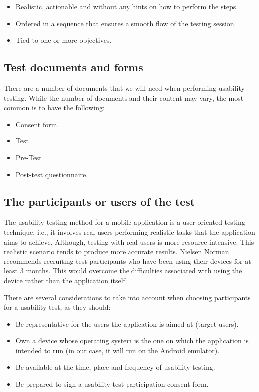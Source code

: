 \documentclass[./main.tex]{subfiles}
\begin{document}
\begin{itemize}
	\item Realistic, actionable and without any hints on how to perform the steps.
	\item Ordered in a sequence that ensures a smooth flow of the testing session.
	\item Tied to one or more objectives.
\end{itemize}

\subsection{Test documents and forms}
There are a number of documents that we will need when performing usability testing. While the number of documents and their content may vary, the most common is to have the following:

\begin{itemize}
	\item Consent form.
	\item Test 
	\item Pre-Test
	\item Post-test questionnaire.
\end{itemize}

\subsection{The participants or users of the test}

The usability testing method for a mobile application is a user-oriented testing technique, i.e., it involves real users performing realistic tasks that the application aims to achieve. Although, testing with real users is more resource intensive. This realistic scenario tends to produce more accurate results.
Nielsen Norman recommends recruiting test participants who have been using their devices for at least 3 months. This would overcome the difficulties associated with using the device rather than the application itself.

There are several considerations to take into account when choosing participants for a usability test, as they should: 

\begin{itemize}
	
	\item Be representative for the users the application is aimed at (target users).
	\item Own a device whose operating system is the one on which the application is intended to run (in our case, it will run on the Android emulator).
	\item Be available at the time, place and frequency of usability testing.
	\item Be prepared to sign a usability test participation consent form.
\end{itemize}
\end{document}
